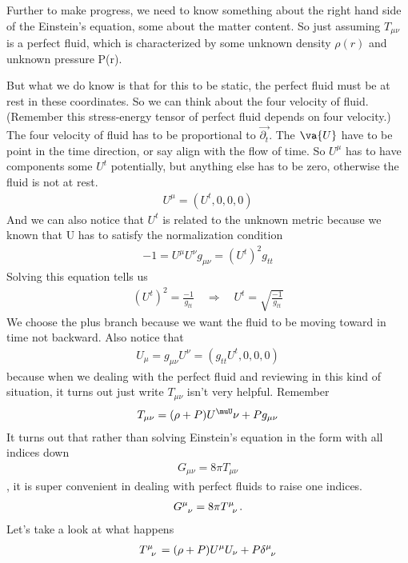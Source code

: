 \documentclass[10pt]{article}
\begin{document}
Further to make progress, we need to know something about the right hand side of the Einstein’s equation, some about the matter content. So just assuming $T_{\mu\nu}$ is a perfect fluid, which is characterized by some unknown density $\rho(r)$ and unknown pressure P(r).

But what we do know is that for this to be static, the perfect fluid must be at rest in these coordinates. So we can think about the four velocity of fluid. (Remember this stress-energy tensor of perfect fluid depends on four velocity.) The four velocity of fluid has to be proportional to $\vec{\partial_t}$. The $\va{U}$ have to be point in the time direction, or say align with the flow of time. So $U^\mu$ has to have components some $U^t$ potentially, but anything else has to be zero, otherwise the fluid is not at rest.
\begin{align}\label{GenMet2}U^\mu=(U^t,0,0,0)\end{align}
And we can also notice that $U^t$ is related to the unknown metric because we known that U has to satisfy the normalization condition
\begin{align}-1=U^\mu U^\nu g_{\mu\nu}=(U^t)^2g_{tt}\end{align}
Solving this equation tells us
\begin{align}(U^t)^2=\frac{-1}{g_{tt}} \quad\Rightarrow\quad U^t=\sqrt{\frac{-1}{g_{tt}}}\end{align}
We choose the plus branch because we want the fluid to be moving toward in time not backward.
Also notice that\begin{align} U_\mu=g_{\mu\nu}U^\nu=(g_{tt}U^t,0,0,0)\end{align}
because when we dealing with the perfect fluid and reviewing in this kind of situation, it turns out just write $T_{\mu\nu}$ isn’t very helpful. Remember \begin{align}T_{\mu\nu}=(\rho+P)U^\muU\nu+Pg_{\mu\nu}\end{align} It turns out that rather than solving Einstein’s equation in the form with all indices down \begin{align}G_{\mu\nu}=8\pi T_{\mu\nu}\end{align}, it is super convenient in dealing with perfect fluids to raise one indices. \begin{align}\tensor{G}{^\mu_\nu}=8\pi \tensor{T}{^\mu_\nu}.\end{align}
Let’s take a look at what happens
\begin{align}\tensor{T}{^\mu_\nu}=(\rho+P)U^\mu U_\nu+ P \tensor{\delta}{^\mu_\nu} \end{align}
\end{document}

